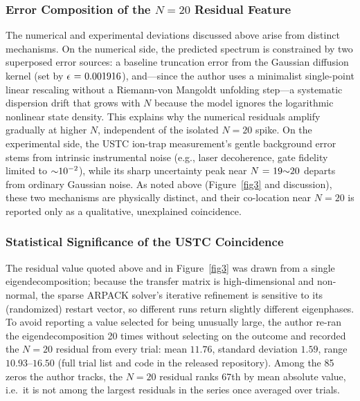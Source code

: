 \documentclass[mca,article,submit,oneauthor,pdftex]{Definitions/mdpi}
\begin{document}
\subsubsection{Error Composition of the $N = 20$ Residual Feature}

The numerical and experimental deviations discussed above arise from
distinct mechanisms. On the numerical side, the predicted spectrum is
constrained by two superposed error sources: a baseline truncation error
from the Gaussian diffusion kernel (set by \(\text{\ensuremath{\epsilon}~=~0.001916}\)),
and---since the author uses a minimalist single-point linear rescaling without a
Riemann-von Mangoldt unfolding step---a systematic dispersion drift that
grows with \(N\) because the model ignores the logarithmic nonlinear state
density. This explains why the numerical residuals amplify gradually at
higher \(N\), independent of the isolated \(N=20\) spike. On the
experimental side, the USTC ion-trap measurement's gentle background
error stems from intrinsic instrumental noise (e.g., laser decoherence,
gate fidelity limited to \(\text{\ensuremath{\sim}}\text{10}^{\text{\ensuremath{-}2}}\)), while its
sharp uncertainty peak near \({N}\text{~=~19\ensuremath{\sim}20}\) departs from
ordinary Gaussian noise. As noted above (Figure~\ref{fig3} and
discussion), these two mechanisms are physically distinct, and their
co-location near \(N=20\) is reported only as a qualitative,
unexplained coincidence.

\subsubsection{Statistical Significance of the USTC Coincidence}\label{sec:n20-significance}

The residual value quoted above and in Figure~\ref{fig3} was drawn from a
single eigendecomposition; because the transfer matrix is high-dimensional
and non-normal, the sparse ARPACK solver's iterative refinement is
sensitive to its (randomized) restart vector, so different runs return
slightly different eigenphases. To avoid reporting a value selected for
being unusually large, the author re-ran the eigendecomposition 20 times without
selecting on the outcome and recorded the $N=20$ residual from every
trial: mean $11.76$, standard deviation $1.59$, range
$10.93$--$16.50$ (full trial list and code in the released repository).
Among the 85 zeros the author tracks, the $N=20$ residual ranks 67th by mean
absolute value, i.e.\ it is not among the largest residuals in the
series once averaged over trials.
\end{document}
